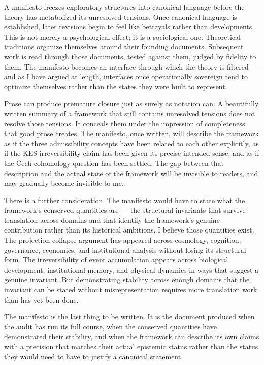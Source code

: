 \documentclass[12pt, a4paper]{article}
\begin{document}
A manifesto freezes exploratory structures into canonical language before the theory has metabolized its unresolved tensions. Once canonical language is established, later revisions begin to feel like betrayals rather than developments. This is not merely a psychological effect; it is a sociological one. Theoretical traditions organize themselves around their founding documents. Subsequent work is read through those documents, tested against them, judged by fidelity to them. The manifesto becomes an interface through which the theory is filtered --- and as I have argued at length, interfaces once operationally sovereign tend to optimize themselves rather than the states they were built to represent.

Prose can produce premature closure just as surely as notation can. A beautifully written summary of a framework that still contains unresolved tensions does not resolve those tensions. It conceals them under the impression of completeness that good prose creates. The manifesto, once written, will describe the framework as if the three admissibility concepts have been related to each other explicitly, as if the KES irreversibility claim has been given its precise intended sense, and as if the \v{C}ech cohomology question has been settled. The gap between that description and the actual state of the framework will be invisible to readers, and may gradually become invisible to me.

There is a further consideration. The manifesto would have to state what the framework's conserved quantities are --- the structural invariants that survive translation across domains and that identify the framework's genuine contribution rather than its historical ambitions. I believe those quantities exist. The projection-collapse argument has appeared across cosmology, cognition, governance, economics, and institutional analysis without losing its structural form. The irreversibility of event accumulation appears across biological development, institutional memory, and physical dynamics in ways that suggest a genuine invariant. But demonstrating stability across enough domains that the invariant can be stated without misrepresentation requires more translation work than has yet been done.

The manifesto is the last thing to be written. It is the document produced when the audit has run its full course, when the conserved quantities have demonstrated their stability, and when the framework can describe its own claims with a precision that matches their actual epistemic status rather than the status they would need to have to justify a canonical statement.
\end{document}

